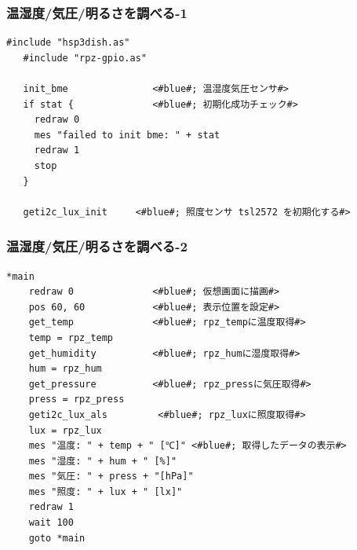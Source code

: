 \documentclass[slide03.tex]{subfiles}
\begin{document}



\begin{frame}[fragile]
  \frametitle{温湿度/気圧/明るさを調べる-1}
  \begin{lstlisting}[title=\sim/03/sensors.hsp 前半, label=sensors.hsp-1]
   #include "hsp3dish.as"
   #include "rpz-gpio.as"

   init_bme               <#blue#; 温湿度気圧センサ#>
   if stat {              <#blue#; 初期化成功チェック#>
     redraw 0
     mes "failed to init bme: " + stat
     redraw 1
     stop
   }

   geti2c_lux_init     <#blue#; 照度センサ tsl2572 を初期化する#>

  \end{lstlisting}
\end{frame}

\begin{frame}[fragile]
  \frametitle{温湿度/気圧/明るさを調べる-2}
  \begin{lstlisting}[title=\sim/03/sensors.hsp 後半, label=sensors.hsp-2]
  *main
    redraw 0              <#blue#; 仮想画面に描画#>
    pos 60, 60            <#blue#; 表示位置を設定#>
    get_temp              <#blue#; rpz_tempに温度取得#>
    temp = rpz_temp
    get_humidity          <#blue#; rpz_humに湿度取得#>
    hum = rpz_hum
    get_pressure          <#blue#; rpz_pressに気圧取得#>
    press = rpz_press
    geti2c_lux_als         <#blue#; rpz_luxに照度取得#>
    lux = rpz_lux
    mes "温度: " + temp + " [℃]" <#blue#; 取得したデータの表示#>
    mes "湿度: " + hum + " [%]"
    mes "気圧: " + press + "[hPa]"
    mes "照度: " + lux + " [lx]"
    redraw 1
    wait 100
    goto *main
  \end{lstlisting}
\end{frame}
\end{document}

